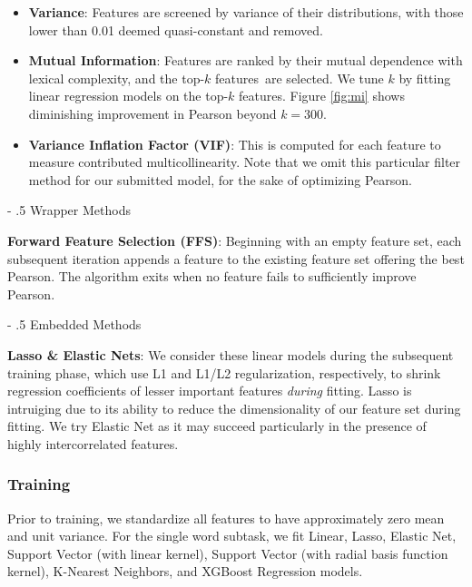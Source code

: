 \documentclass[11pt,a4paper]{article}
\makeatletter
\renewcommand\paragraph{%
    \@startsection{paragraph}{4}{0mm}%
        {-\baselineskip}%
        {.5\baselineskip}%
        {\normalfont\normalsize\bfseries}}
\makeatother
\begin{document}
\begin{itemize}
  \item \textbf{Variance}: Features are screened by variance of their distributions, with those lower than 0.01 deemed quasi-constant and removed.
  \item \textbf{Mutual Information}: Features are ranked by their mutual dependence with lexical complexity, and the top-$k$ features are selected. We tune $k$ by fitting linear regression models on the top-$k$ features. Figure \ref{fig:mi} shows diminishing improvement in Pearson beyond $k=300$.
  \item \textbf{Variance Inflation Factor (VIF)}: This is computed for each feature to measure contributed multicollinearity. Note that we omit this particular filter method for our submitted model, for the sake of optimizing Pearson.
\end{itemize}

\paragraph{Wrapper Methods}

\textbf{Forward Feature Selection (FFS)}: Beginning with an empty feature set, each subsequent iteration appends a feature to the existing feature set offering the best Pearson. The algorithm exits when no feature fails to sufficiently improve Pearson.

\paragraph{Embedded Methods}

\textbf{Lasso \& Elastic Nets}: We consider these linear models during the subsequent training phase, which use L1 and L1/L2 regularization, respectively, to shrink regression coefficients of lesser important features \textit{during} fitting. Lasso \citep{Tibshirani.x} is intruiging due to its ability to reduce the dimensionality of our feature set during fitting. We try Elastic Net \citep{10.2307/3647580} as it may succeed particularly in the presence of highly intercorrelated features.

\subsubsection{Training}

Prior to training, we standardize all features to have approximately zero mean and unit variance. For the single word subtask, we fit Linear, Lasso, Elastic Net, Support Vector (with linear kernel),  Support Vector (with radial basis function kernel), K-Nearest Neighbors, and XGBoost Regression models. 
\end{document}
